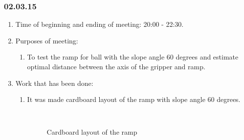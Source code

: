 \subsubsection{02.03.15}
\begin{enumerate}
	
	\item Time of beginning and ending of meeting: 20:00 - 22:30.
	
	\item Purposes of meeting:
	\begin{enumerate}
		
		\item To test the ramp for ball with the slope angle 60 degrees and estimate optimal distance between the axis of the gripper and ramp.
		
	\end{enumerate}

	\item Work that has been done:
	\begin{enumerate}
		
		\item It was made cardboard layout of the ramp with slope angle 60 degrees.
		 		         \begin{figure}[H]
		 		         	\begin{minipage}[h]{0.2\linewidth}
		 		         		\center  
		 		         	\end{minipage}
		 		         	\begin{minipage}[h]{0.6\linewidth}
		 		         		\caption{Cardboard layout of the ramp}
		 		         	\end{minipage}
		 		         \end{figure}		
		

\end{enumerate}
\end{enumerate}
